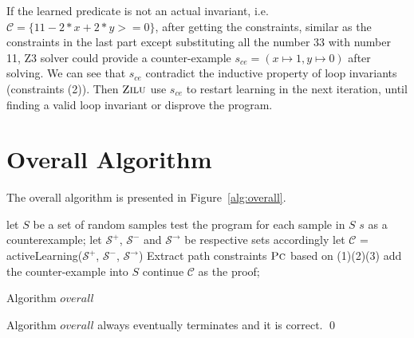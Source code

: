 If the learned predicate is not an actual invariant, i.e. $\mathcal{C} = \{11-2*x+2*y>=0\}$,
after getting the constraints, similar as the constraints in the last part except substituting all the number 33 with number 11, 
Z3 solver could provide a counter-example $s_{ce} = (x \mapsto 1, y \mapsto 0)$ after solving.
We can see that $s_{ce}$ contradict the inductive property of loop invariants (constraints (2)).
Then $\textsc{Zilu}$ use $s_{ce}$ to restart learning in the next iteration, until finding a valid loop invariant or disprove the program.


\section {Overall Algorithm}
The overall algorithm is presented in Figure~\ref{alg:overall}.
\begin{algorithm}[!h]
\SetAlgoVlined
\Indm
{}
\Indp
let $S$ be a set of random samples\;
 {
    test the program for each sample in $S$\;
     {
        \Return $s$ as a counterexample;
    }
    let $\mathcal{S}^+$, $\mathcal{S}^-$ and $\mathcal{S}^\rightarrow$ be respective sets accordingly\;
    let $\mathcal{C}$ = activeLearning($\mathcal{S}^+$, $\mathcal{S}^-$, $\mathcal{S}^\rightarrow$)\;
    Extract path constraints $\textsc{Pc}$ based on (1)(2)(3)\;
     {
         {
            add the counter-example into $S$\;
            continue\;
        }
    }
    \Return $\mathcal{C}$ as the proof;
}
\caption{Algorithm $overall$}
\label{alg:overall}
\end{algorithm}





\begin{theorem}
Algorithm $overall$ always eventually terminates and it is correct. \hfill \qed
\end{theorem}


